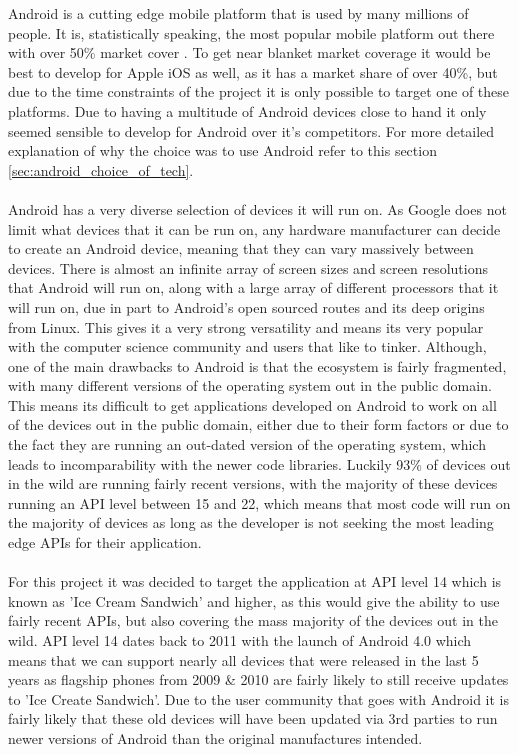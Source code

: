 Android is a cutting edge mobile platform that is used by many millions of people. It is, statistically speaking, the most popular mobile platform out there with over 50\% market cover \cite{statista:devicestats:2015:online}. To get near blanket market coverage it would be best to develop for Apple iOS as well, as it has a market share of over 40\%, but due to the time constraints of the project it is only possible to target one of these platforms. Due to having a multitude of Android devices close to hand it only seemed sensible to develop for Android over it's competitors. For more detailed explanation of why the choice was to use Android refer to this section \ref{sec:android_choice_of_tech}.\\
\\
Android has a very diverse selection of devices it will run on. As Google does not limit what devices that it can be run on, any hardware manufacturer can decide to create an Android device, meaning that they can vary massively between devices. There is almost an infinite array of screen sizes and screen resolutions that Android will run on, along with a large array of different processors that it will run on, due in part to Android's open sourced routes and its deep origins from Linux. This gives it a very strong versatility and means its very popular with the computer science community and users that like to tinker. Although, one of the main drawbacks to Android is that the ecosystem is fairly fragmented, with many different versions of the operating system out in the public domain. This means its difficult to get applications developed on Android to work on all of the devices out in the public domain, either due to their form factors or due to the fact they are running an out-dated version of the operating system, which leads to incomparability with the newer code libraries. Luckily 93\% of devices \cite{google:osstats:2015:online} out in the wild are running fairly recent versions, with the majority of these devices running an API level between 15 and 22, which means that most code will run on the majority of devices as long as the developer is not seeking the most leading edge APIs for their application.\\
\\
For this project it was decided to target the application at API level 14 which is known as 'Ice Cream Sandwich' and higher, as this would give the ability to use fairly recent APIs, but also covering the mass majority of the devices out in the wild. API level 14 dates back to 2011 with the launch of Android 4.0 which means that we can support nearly all devices that were released in the last 5 years as flagship phones from 2009 \& 2010 are fairly likely to still receive updates to 'Ice Create Sandwich'. Due to the user community that goes with Android it is fairly likely that these old devices will have been updated via 3rd parties to run newer versions of Android than the original manufactures intended.\\

